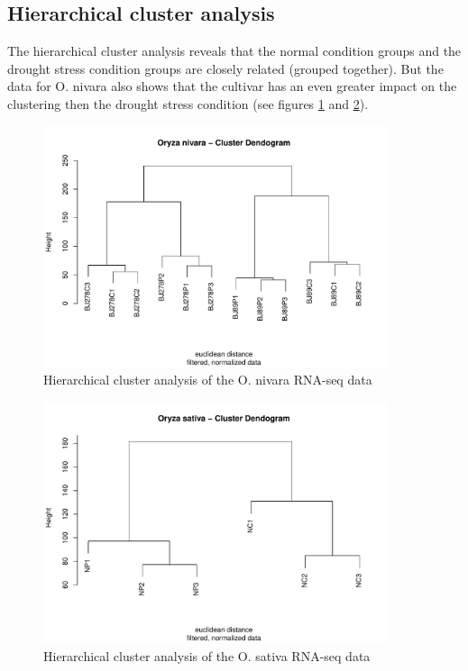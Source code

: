 \subsection{Hierarchical cluster analysis}

The hierarchical cluster analysis reveals that the normal condition groups and the drought stress condition groups are closely related (grouped together). But the data for O. nivara also shows that the cultivar has an even greater impact on the clustering then the drought stress condition (see figures \ref{fig:3.1-Clust-Dendrogram-Oryza_nivara} and \ref{fig:3.1-Clust-Dendrogram-Oryza_sativa}).

\begin{figure}[htbp]
    \caption{Hierarchical cluster analysis of the O. nivara RNA-seq data}
    \label{fig:3.1-Clust-Dendrogram-Oryza_nivara}
    \includegraphics[width=0.9\textwidth]{../../results/plots-and-tables/3.1-Clust-Dendrogram-Oryza_nivara}
\end{figure}

\begin{figure}[htbp]
    \caption{Hierarchical cluster analysis of the O. sativa RNA-seq data}
    \label{fig:3.1-Clust-Dendrogram-Oryza_sativa}
    \includegraphics[width=0.9\textwidth]{../../results/plots-and-tables/3.1-Clust-Dendrogram-Oryza_sativa}
\end{figure}


